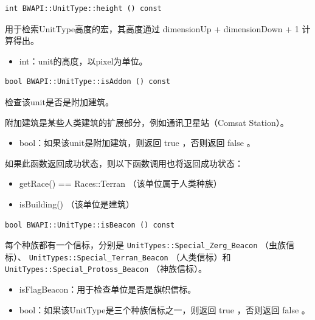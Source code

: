 \begin{tcolorbox}[colback=white, colframe=black!60!white, title=height(), arc=0mm]
    \begin{verbatim}
int BWAPI::UnitType::height () const
    \end{verbatim}
    用于检索UnitType高度的宏，其高度通过   dimensionUp + dimensionDown + 1   计算得出。
\begin{return}
\begin{itemize}
    \item int：unit的高度，以pixel为单位。
\end{itemize}
\end{return}
\end{tcolorbox}


\begin{tcolorbox}[colback=white, colframe=black!60!white, title=isAddon(), arc=0mm]
    \begin{verbatim}
bool BWAPI::UnitType::isAddon () const
    \end{verbatim}
    检查该unit是否是附加建筑。\par 附加建筑是某些人类建筑的扩展部分，例如通讯卫星站（Comsat Station）。
\begin{return}
\begin{itemize}
    \item bool：如果该unit是附加建筑，则返回   true  ，否则返回   false  。
\end{itemize}
\end{return}
\begin{note}
    如果此函数返回成功状态，则以下函数调用也将返回成功状态：
    \begin{itemize}
        \item getRace() == Races::Terran  （该单位属于人类种族）
        \item isBuilding()  （该单位是建筑）
    \end{itemize}
\end{note}
\end{tcolorbox}


\begin{tcolorbox}[colback=white, colframe=black!60!white, title=isBeacon(), arc=0mm]
    \begin{verbatim}
bool BWAPI::UnitType::isBeacon () const
    \end{verbatim}
    每个种族都有一个信标，分别是   \verb|UnitTypes::Special_Zerg_Beacon|  （虫族信标）、  \verb|UnitTypes::Special_Terran_Beacon|  （人类信标）和   \verb|UnitTypes::Special_Protoss_Beacon|  （神族信标）。
\begin{refer}
    \begin{itemize}
        \item  isFlagBeacon：用于检查单位是否是旗帜信标。
    \end{itemize}
\end{refer}
\begin{return}
\begin{itemize}
    \item bool：如果该UnitType是三个种族信标之一，则返回   true  ，否则返回   false  。
\end{itemize}
\end{return}
\end{tcolorbox}


